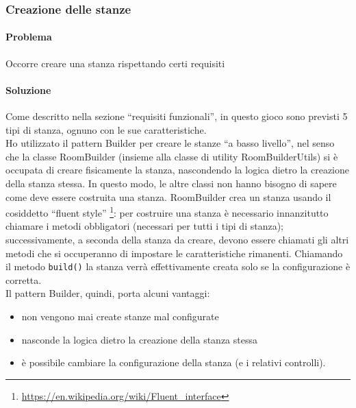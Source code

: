 \documentclass[a4paper,12pt]{report}
\begin{document}
\subsubsection{Creazione delle stanze}
\paragraph{Problema} Occorre creare una stanza rispettando certi requisiti
\paragraph{Soluzione} Come descritto nella sezione ``requisiti funzionali'', in questo gioco sono previsti 5 tipi
di stanza, ognuno con le sue caratteristiche. 
\\Ho utilizzato il pattern Builder per creare le stanze ``a basso livello'', nel senso che la classe RoomBuilder (insieme alla classe di utility RoomBuilderUtils) si è occupata di creare fisicamente la stanza, nascondendo la logica dietro la creazione della stanza stessa. 
In questo modo, le altre classi non hanno bisogno di sapere come deve essere costruita una stanza. 
RoomBuilder crea un stanza usando il cosiddetto ``fluent style'' \footnote{\url{https://en.wikipedia.org/wiki/Fluent_interface}}: 
per costruire una stanza è necessario innanzitutto chiamare i metodi obbligatori (necessari per tutti i tipi di stanza); successivamente, 
a seconda della stanza da creare, devono essere chiamati gli altri metodi
che si occuperanno di impostare le caratteristiche rimanenti.
Chiamando il metodo \texttt{build()} la stanza verrà effettivamente
creata solo se la configurazione è corretta.
\\Il pattern Builder, quindi, porta alcuni vantaggi:
\begin{itemize}
    \item non vengono mai create stanze mal configurate 
    \item nasconde la logica dietro la creazione della stanza stessa
    \item è possibile cambiare la configurazione della stanza (e i relativi controlli).
\end{itemize}
\end{document}
